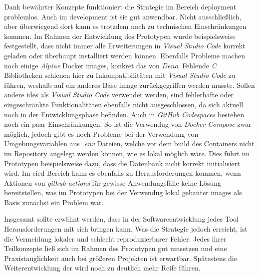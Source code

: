 Dank bewährter Konzepte funktioniert die Strategie im Bereich \Gls{deployment} problemlos. Auch im \Gls{development} ist sie gut anwendbar. Nicht ausschließlich, aber überwiegend dort kann es trotzdem noch zu technischen Einschränkungen kommen. Im Rahmen der Entwicklung des Prototypen wurde beispielsweise festgestellt, dass nicht immer alle Erweiterungen in \textit{Visual Studio Code} korrekt geladen oder überhaupt installiert werden können. Ebenfalls Probleme machen noch einige \textit{Alpine} Docker \Glspl{image}, konkret das von \textit{Deno}. Fehlende \textit{C} Bibliotheken schienen hier zu Inkompatibilitäten mit \textit{Visual Studio Code} zu führen, weshalb auf ein anderes Base \Gls{image} zurückgegriffen werden musste. Sollen andere \Glspl{ide} als \textit{Visual Studio Code} verwendet werden, sind fehlerhafte oder eingeschränkte Funktionalitäten ebenfalls nicht ausgeschlossen, da sich  aktuell noch in der Entwicklungsphase befinden. Auch in \textit{GitHub Codespaces} bestehen noch ein paar Einschränkungen. So ist die Verwendug von \textit{Docker Compose} zwar möglich, jedoch gibt es noch Probleme bei der Verwendung von Umgebungsvariablen aus \textit{.env} Dateien, welche vor dem \Gls{build} des Containers nicht im Repository angelegt werden können, wie es lokal möglich wäre. Dies führt im Prototypen beispielsweise dazu, dass die Datenbank nicht korrekt initialisiert wird. Im \Gls{cicd} Bereich kann es ebenfalls zu Herausforderungen kommen, wenn Aktionen von \textit{\Gls{github-actions}} für gewisse Anwendungsfälle keine Lösung bereitstellen, was im Prototypen bei der Verwendug lokal gebauter \Glspl{image} als Basis zunächst ein Problem war.

Insgesamt sollte erwähnt werden, dass in der Softwareentwicklung jedes Tool Herausforderungen mit sich bringen kann. Was die  Strategie jedoch erreicht, ist die Vermeidung lokaler und schlecht reproduzierbarer Fehler. Jedes ihrer Teilkonzepte ließ sich im Rahmen des Prototypen gut umsetzen und eine Praxistauglichkeit auch bei größeren Projekten ist erwartbar. Spätestens die Weiterentwicklung der  wird noch zu deutlich mehr Reife führen.
